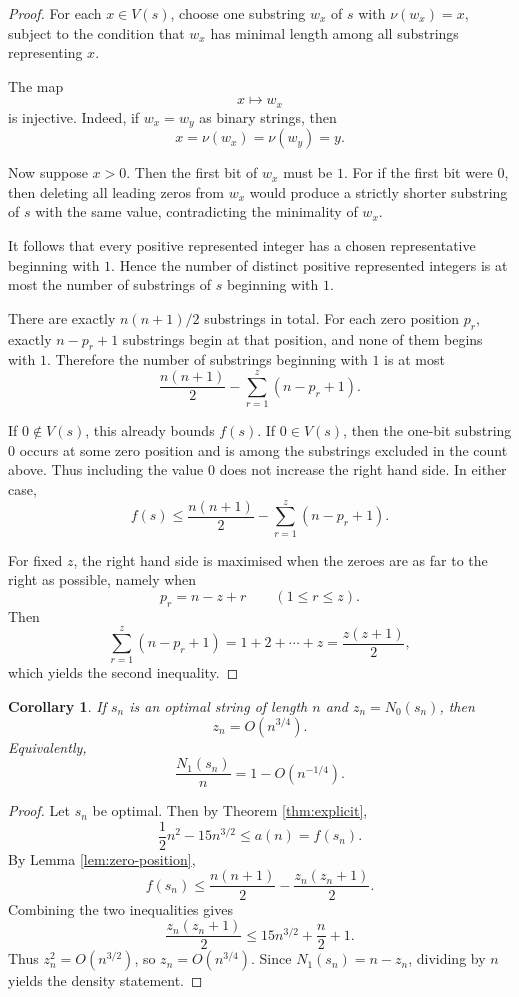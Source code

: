 \documentclass[11pt]{article}
\newtheorem{corollary}[theorem]{Corollary}
\newcommand{\val}{\nu}
\newcommand{\ones}{N_1}
\newcommand{\zeros}{N_0}
\begin{document}
\begin{proof}
For each $x\in V(s)$, choose one substring $w_x$ of $s$ with $\val(w_x)=x$, subject to the condition that $w_x$ has minimal length among all substrings representing $x$.

The map
\[
x\longmapsto w_x
\]
is injective.  Indeed, if $w_x=w_y$ as binary strings, then
\[
x=\val(w_x)=\val(w_y)=y.
\]

Now suppose $x>0$.  Then the first bit of $w_x$ must be $1$.  For if the first bit were $0$, then deleting all leading zeros from $w_x$ would produce a strictly shorter substring of $s$ with the same value, contradicting the minimality of $w_x$.

It follows that every positive represented integer has a chosen representative beginning with $1$.  Hence the number of distinct positive represented integers is at most the number of substrings of $s$ beginning with $1$.

There are exactly $n(n+1)/2$ substrings in total.  For each zero position $p_r$, exactly $n-p_r+1$ substrings begin at that position, and none of them begins with $1$.  Therefore the number of substrings beginning with $1$ is at most
\[
\frac{n(n+1)}{2}-\sum_{r=1}^z (n-p_r+1).
\]

If $0\notin V(s)$, this already bounds $f(s)$.  If $0\in V(s)$, then the one-bit substring $0$ occurs at some zero position and is among the substrings excluded in the count above.  Thus including the value $0$ does not increase the right hand side.  In either case,
\[
f(s)\le \frac{n(n+1)}{2}-\sum_{r=1}^z (n-p_r+1).
\]

For fixed $z$, the right hand side is maximised when the zeroes are as far to the right as possible, namely when
\[
p_r=n-z+r\qquad (1\le r\le z).
\]
Then
\[
\sum_{r=1}^z (n-p_r+1)=1+2+\cdots+z=\frac{z(z+1)}{2},
\]
which yields the second inequality.
\end{proof}

\begin{corollary}\label{cor:optimal-density-weak}
If $s_n$ is an optimal string of length $n$ and $z_n=\zeros(s_n)$, then
\[
z_n=O(n^{3/4}).
\]
Equivalently,
\[
\frac{\ones(s_n)}{n}=1-O(n^{-1/4}).
\]
\end{corollary}

\begin{proof}
Let $s_n$ be optimal.  Then by Theorem \ref{thm:explicit},
\[
\frac12 n^2-15n^{3/2}\le a(n)=f(s_n).
\]
By Lemma \ref{lem:zero-position},
\[
f(s_n)\le \frac{n(n+1)}2-\frac{z_n(z_n+1)}2.
\]
Combining the two inequalities gives
\[
\frac{z_n(z_n+1)}2\le 15n^{3/2}+\frac n2+1.
\]
Thus $z_n^2=O(n^{3/2})$, so $z_n=O(n^{3/4})$.  Since $\ones(s_n)=n-z_n$, dividing by $n$ yields the density statement.
\end{proof}
\end{document}
